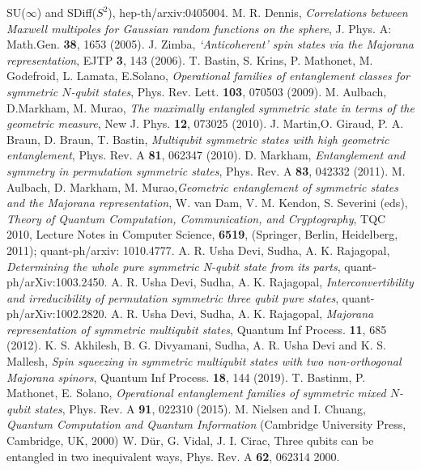 {\begin{thebibliography}{99}
{SU($\infty$) and SDiff($S^2$)}, hep-th/arxiv:0405004.  
  M. R. Dennis, {\em Correlations between Maxwell multipoles for
Gaussian random functions on the sphere}, J. Phys. A: Math.Gen. {\bf 38}, 1653 (2005).
 J. Zimba, {\em `Anticoherent' spin states via the
Majorana representation},  EJTP {\bf 3}, 143 (2006).
  T. Bastin, S. Krins, P. Mathonet, M. Godefroid, L. Lamata, E.Solano, {\em Operational families of entanglement classes for symmetric $N$-qubit states}, Phys. Rev. Lett. {\bf 103},  070503 (2009).
 M. Aulbach, D.Markham,  M. Murao, {\em The maximally entangled symmetric state in terms of
the geometric measure}, New J. Phys. {\bf 12}, 073025 (2010).
 J. Martin,O. Giraud, P. A. Braun, D. Braun, T. Bastin, {\em Multiqubit symmetric states with high geometric entanglement}, Phys. Rev. A {\bf 81}, 062347 (2010).
 D. Markham, {\em Entanglement and symmetry in permutation symmetric states}, Phys. Rev. A 
{\bf 83}, 042332 (2011).
 M. Aulbach,  D. Markham, M. Murao,{\em Geometric entanglement of symmetric states and the Majorana representation}, W. van Dam, V. M. Kendon, S. Severini (eds), {\em Theory of Quantum Computation, Communication, and Cryptography}, TQC 2010, Lecture Notes in Computer Science, {\bf 6519}, (Springer, Berlin, Heidelberg, 2011); quant-ph/arxiv: 1010.4777.
 A. R. Usha Devi,  Sudha, A. K. Rajagopal, {\em Determining the whole pure symmetric N-qubit state from its parts},  quant-ph/arXiv:1003.2450.
 A. R. Usha Devi,  Sudha, A. K. Rajagopal, {\em Interconvertibility and irreducibility of permutation symmetric three qubit pure states},
quant-ph/arXiv:1002.2820. 
 A. R. Usha Devi,  Sudha, A. K. Rajagopal, {\em  Majorana representation of symmetric multiqubit states}, Quantum Inf Process. {\bf 11}, 685 (2012).
 K. S. Akhilesh, B. G. Divyamani, Sudha, A. R. Usha Devi and K. S. Mallesh, {\em Spin squeezing in symmetric multiqubit states with two non-orthogonal Majorana spinors}, Quantum Inf Process. {\bf 18}, 144 (2019).  
 T. Bastinm, P. Mathonet, E. Solano, {\em Operational entanglement families of symmetric mixed $N$-qubit states}, Phys. Rev. A {\bf 91}, 022310 (2015).   
 M. Nielsen and I. Chuang, {\em Quantum Computation and Quantum Information} (Cambridge University Press,
Cambridge, UK, 2000)
 W. D{\"u}r,  G. Vidal, J. I. Cirac, {Three qubits can be entangled in two inequivalent ways}, Phys. Rev. A {\bf 62}, 062314 2000.

\end{thebibliography}}
